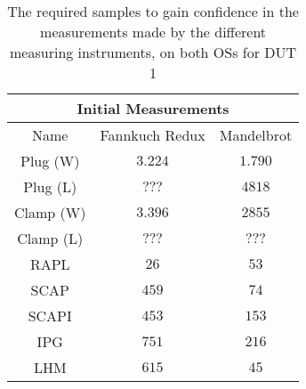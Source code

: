 \begin{table}[H]
    \centering
    \begin{tabular}{|| c | c | c ||}
    \hline
    \multicolumn{3}{||c||}{Initial Measurements} \\ [0.5ex] \hline\hline
    Name & Fannkuch Redux & Mandelbrot \\\hline
    Plug (W) & $3.224$ & $1.790$ \\
    Plug (L) & $???$ & $4818$ \\
    Clamp (W) & $3.396$ & $2855$ \\
    Clamp (L) & $???$ & $???$ \\
    RAPL & $26$ & $53$ \\
    SCAP & $459$ & $74$ \\
    SCAPI & $453$ & $153$ \\
    IPG & $751$ & $216$ \\
    LHM & $615$ & $45$ \\\hline
    \end{tabular}
    \caption{The required samples to gain confidence in the measurements made by the different measuring instruments, on both OSs for DUT 1}
    \label{tab:initial-measurements-exp-2-dut-1}
\end{table}